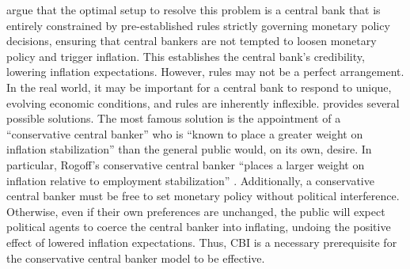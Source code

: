 \documentclass[12pt,a4paper]{article}
\begin{document}
\begin{doublespace}
\textcite{barro_rules_1983} argue that the optimal setup to resolve this problem is a central bank that is entirely constrained by pre-established rules strictly governing monetary policy decisions, ensuring that central bankers are not tempted to loosen monetary policy and trigger inflation. This establishes the central bank's credibility, lowering inflation expectations. However, rules may not be a perfect arrangement. In the real world, it may be important for a central bank to respond to unique, evolving economic conditions, and rules are inherently inflexible. \textcite[1177]{rogoff_optimal_1985} provides several possible solutions. The most famous solution is the appointment of a ``conservative central banker'' who is ``known to place a greater weight on inflation stabilization'' than the general public would, on its own, desire. In particular, Rogoff's conservative central banker ``places a larger weight on inflation relative to employment stabilization'' \parencite[2]{romelli_trends_2024}. Additionally, a conservative central banker must be free to set monetary policy without political interference. Otherwise, even if their own preferences are unchanged, the public will expect political agents to coerce the central banker into inflating, undoing the positive effect of lowered inflation expectations. Thus, CBI is a necessary prerequisite for the conservative central banker model to be effective.


\end{doublespace}
\end{document}
